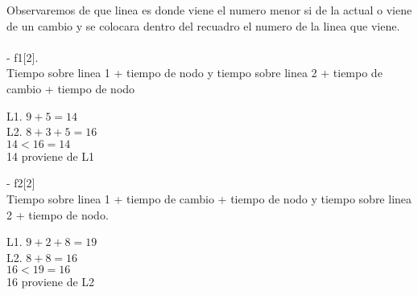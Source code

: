 \documentclass[12pt,twoside]{article}
\begin{document}
 Observaremos de que linea es donde viene el numero menor si de la actual o viene de un cambio y se colocara dentro del recuadro el numero de la linea que viene.\\ \\
- f{1}[2]. \\
Tiempo sobre linea 1 + tiempo de nodo y tiempo sobre linea 2 + tiempo de cambio + tiempo de nodo\\
\begin{center}
   L1.  $9 + 5 = 14$\\
   L2.  $8 + 3 + 5 = 16$\\
    $14 < 16 = 14$\\
    14 proviene de L1
\end{center}

- f{2}[2]\\
Tiempo sobre linea 1 + tiempo de cambio + tiempo de nodo y tiempo sobre linea 2 + tiempo de nodo.
\begin{center}
   L1.  $9 + 2 + 8 = 19$\\
   L2.  $8 + 8 = 16$\\
    $16 < 19 = 16$\\
    16 proviene de L2
\end{center}
\end{document}
